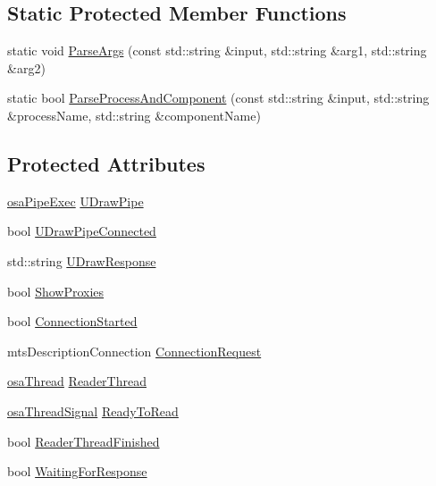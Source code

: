 \subsection*{Static Protected Member Functions}
\begin{DoxyCompactItemize}
\item 
static void \hyperlink{classmts_component_viewer_a514501a010d6f9cde03032d7853cde39}{Parse\+Args} (const std\+::string \&input, std\+::string \&arg1, std\+::string \&arg2)
\item 
static bool \hyperlink{classmts_component_viewer_aaaa3f74701e2fc95e7a26939dccee4b1}{Parse\+Process\+And\+Component} (const std\+::string \&input, std\+::string \&process\+Name, std\+::string \&component\+Name)
\end{DoxyCompactItemize}
\subsection*{Protected Attributes}
\begin{DoxyCompactItemize}
\item 
\hyperlink{classosa_pipe_exec}{osa\+Pipe\+Exec} \hyperlink{classmts_component_viewer_a4f2747dc20890be285fa6b031516c6dc}{U\+Draw\+Pipe}
\item 
bool \hyperlink{classmts_component_viewer_a7590f5f827427231d8fe2bd813feb22e}{U\+Draw\+Pipe\+Connected}
\item 
std\+::string \hyperlink{classmts_component_viewer_acae080559e0ab6cbb24070743348d9aa}{U\+Draw\+Response}
\item 
bool \hyperlink{classmts_component_viewer_a3e3249972f2cd16f18ea84aa0df92218}{Show\+Proxies}
\item 
bool \hyperlink{classmts_component_viewer_aa6617f20137e55bf8fe983d8587a22d2}{Connection\+Started}
\item 
mts\+Description\+Connection \hyperlink{classmts_component_viewer_ab4e2905d1679386f9a8d15d0bcaaf996}{Connection\+Request}
\item 
\hyperlink{classosa_thread}{osa\+Thread} \hyperlink{classmts_component_viewer_a5b608706d9dec221cd4ca599a165fec7}{Reader\+Thread}
\item 
\hyperlink{classosa_thread_signal}{osa\+Thread\+Signal} \hyperlink{classmts_component_viewer_a2b172a1000cad46b886f92073ca3a650}{Ready\+To\+Read}
\item 
bool \hyperlink{classmts_component_viewer_ab5cfa733f00890d5ee7ef44eac6624cf}{Reader\+Thread\+Finished}
\item 
bool \hyperlink{classmts_component_viewer_ad0d7132119ce154a8e7b646153ae0cc0}{Waiting\+For\+Response}
\end{DoxyCompactItemize}
